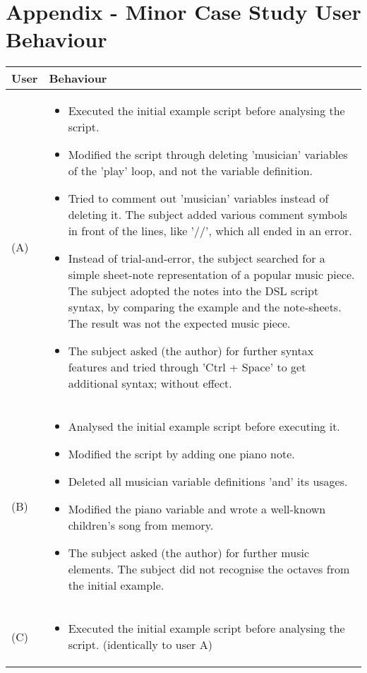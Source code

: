 \chapter{Appendix - Minor Case Study User Behaviour}
\label{APPENDIX_B}

\begin{longtable}{p{50pt}|p{320pt}}
\rowcolor{htwg-teal} 
\textbf{User}		& \textbf{Behaviour}     \\
\endhead
(A)                  		& \begin{itemize}
\item  Executed the initial example script before analysing the script.
\item  Modified the script through deleting 'musician' variables of the 'play' loop, and not the variable definition.
\item  Tried to comment out 'musician' variables instead of deleting it. The subject added various comment symbols in front of the lines, like '//', which all ended in an error.
\item  Instead of trial-and-error, the subject searched for a simple sheet-note representation of a popular music piece. The subject adopted the notes into the DSL script syntax, by comparing the example and the note-sheets. The result was not the expected music piece.
\item  The subject asked (the author) for further syntax features and tried through 'Ctrl + Space' to get additional syntax; without effect.
\end{itemize} \\
(B)                 		& \begin{itemize}
\item  Analysed the initial example script before executing it.
\item  Modified the script by adding one piano note.
\item  Deleted all musician variable definitions 'and' its usages.
\item  Modified the piano variable and wrote a well-known children's song from memory.
\item  The subject asked (the author) for further music elements. The subject did not recognise the octaves from the initial example.
\end{itemize} \\
(C)                 		& \begin{itemize}
\item Executed the initial example script before analysing the script. (identically to user A)

\end{itemize}
\end{longtable}
